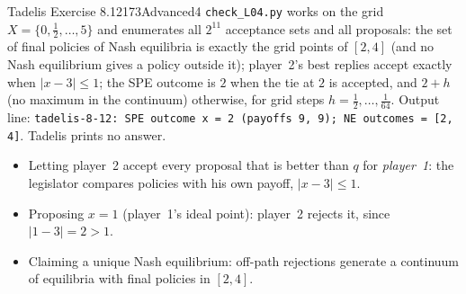 \begin{exsol}{Tadelis Exercise 8.12}{173}{Advanced}{4}
\verify \texttt{check\_L04.py} works on the grid $X = \{0, \frac12, \dots, 5\}$ and enumerates all
$2^{11}$ acceptance sets and all proposals: the set of final policies of Nash equilibria is exactly the grid points
of $[2,4]$ (and no Nash equilibrium gives a policy outside it); player~2's best replies accept exactly when
$|x - 3| \le 1$; the SPE outcome is $2$ when the tie at $2$ is accepted, and $2 + h$ (no maximum in the
continuum) otherwise, for grid steps $h = \frac12, \dots, \frac1{64}$. Output line: \texttt{tadelis-8-12: SPE
outcome x = 2 (payoffs 9, 9); NE outcomes = [2, 4]}. Tadelis prints no answer.

\mistakes
\begin{itemize}
  \item Letting player~2 accept every proposal that is better than $q$ for \emph{player~1}: the legislator
  compares policies with his own payoff, $|x - 3| \le 1$.
  \item Proposing $x = 1$ (player~1's ideal point): player~2 rejects it, since $|1 - 3| = 2 > 1$.
  \item Claiming a unique Nash equilibrium: off-path rejections generate a continuum of equilibria with
  final policies in $[2,4]$.
\end{itemize}

\end{exsol}
